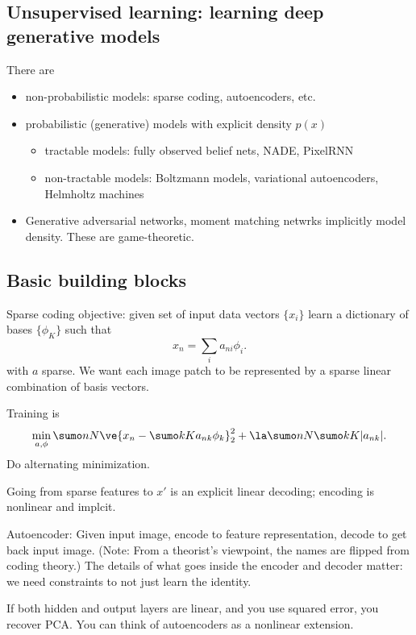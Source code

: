 
\subsection{Unsupervised learning: learning deep generative models}

There are
\begin{itemize}
\item
non-probabilistic models: sparse coding, autoencoders, etc.
\item
probabilistic (generative) models with explicit density $p(x)$
\begin{itemize}
\item
tractable models: fully observed belief nets, NADE, PixelRNN
\item
non-tractable models: Boltzmann models, variational autoencoders, Helmholtz machines
\end{itemize}
\item
Generative adversarial networks, moment matching netwrks implicitly model density. These are game-theoretic.
\end{itemize}
\subsection{Basic building blocks}

Sparse coding objective: given set of input data vectors $\{x_i\}$ learn a dictionary of bases $\{\phi_K\}$ such that
$$
x_n = \sum_i a_{ni} \phi_i.
$$
with $a$ sparse. We want each image patch to be represented by a sparse linear combination of basis vectors.

Training is
$$
\min_{a,\phi} \sumo nN \ve{x_n - \sumo kK a_{nk} \phi_k}_2^2 + \la \sumo nN \sumo kK |a_{nk}|.
$$
Do alternating minimization. 


Going from sparse features to $x'$ is an explicit linear decoding; encoding is nonlinear and implcit.

Autoencoder: Given input image, encode to feature representation, decode to get back input image.
(Note:  From a theorist's viewpoint, the names are flipped from coding theory.)
The details of what goes inside the encoder and decoder matter: we need constraints to not just learn the identity.


If both hidden and output layers are linear,  and you use squared error, you recover PCA. You can think of autoencoders as a nonlinear extension.

